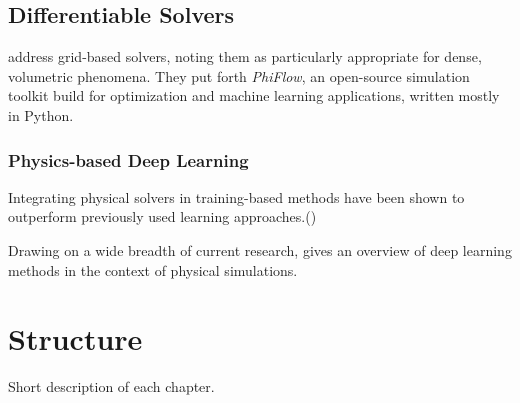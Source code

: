 \subsection{Differentiable Solvers}
\cite{control-pde} address grid-based solvers, noting them as
particularly appropriate for dense, volumetric phenomena. They put forth
\textit{PhiFlow}, an open-source simulation toolkit build for optimization and
machine learning applications, written mostly in Python.


\subsubsection*{Physics-based Deep Learning}
Integrating physical solvers in training-based methods have been shown to
outperform previously used learning approaches.(\cite{solver-in-the-loop})

Drawing on a wide breadth of current research, \cite{pbdl} gives an overview of
deep learning methods in the context of physical simulations. 



\section{Structure}
Short description of each chapter.
